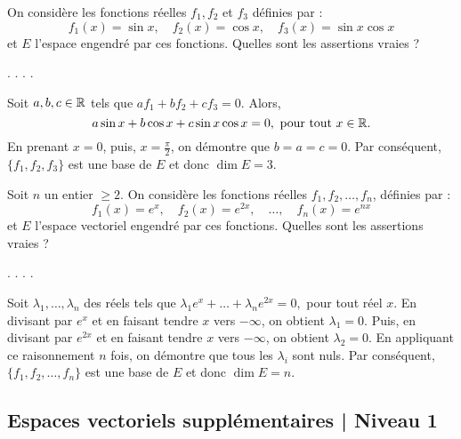 \begin{question}
On considère les fonctions réelles $f_1, f_2$ et $f_3$ définies par : 
$$f_1(x)=\sin x,\quad f_2(x)= \cos x,\quad f_3(x)= \sin x \cos x$$
et $E$ l'espace engendré par ces fonctions. Quelles sont les assertions vraies ?
\begin{answers}  
.
.
.
.
\end{answers}
\begin{explanations} Soit $a,b,c \in \mathbb{R}$ tels que  $af_1+bf_2+cf_3=0$. Alors, 
$$a\sin x +b\cos x+c\sin x \cos x = 0,\mbox{ pour tout }x\in \mathbb{R}.$$ 
En prenant $x=0$, puis, $x=\frac{\pi}{2}$, on démontre que $b=a=c=0$. Par conséquent, $\{f_1, f_2, f_3\}$ est une base de $E$ et donc $\dim E =3$. 
\end{explanations}
\end{question}


\begin{question}
Soit $n$ un entier $\geq 2$. On considère les fonctions réelles $f_1, f_2, \dots , f_n$, définies par :
$$f_1(x)=e^x,\quad f_2(x)= e^{2x},\quad \dots ,\quad f_n(x) = e^{nx}$$
et $E$ l'espace vectoriel engendré par ces fonctions. Quelles sont les assertions vraies ?
\begin{answers}  
.
.
.
.
\end{answers}
\begin{explanations} Soit $\lambda_1, \dots, \lambda_n$ des réels tels que $\lambda_1e^x+ \dots+ \lambda_ne^{2x}=0,$
pour tout réel $x$. En divisant par $e^x$ et en faisant tendre $x$ vers $-\infty$, on obtient $\lambda_1=0$. Puis, en divisant par $e^{2x}$ et en faisant tendre $x$ vers $-\infty$, on obtient $\lambda_2=0$. En appliquant ce raisonnement $n$ fois, on démontre que tous les $\lambda_i$ sont nuls. Par conséquent,  
$\{f_1, f_2,  \dots , f_n\}$ est une base de $E$ et donc $\dim E =n$.
\end{explanations}
\end{question}


\subsection{Espaces vectoriels supplémentaires | Niveau 1}

